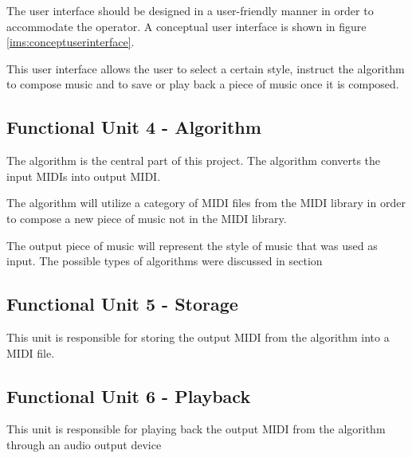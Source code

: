 The user interface should be designed in a user-friendly manner in order to accommodate the operator.
A conceptual user interface is shown in figure \ref{ims:conceptuserinterface}. 

This user interface allows the user to select a certain style, instruct the algorithm to compose music and to save or play back a piece of music once it is composed.

\subsection{Functional Unit 4 - Algorithm}
The algorithm is the central part of this project. The algorithm converts the input \acp{MIDI} into output \ac{MIDI}.

The algorithm will utilize a category of \ac{MIDI} files from the \ac{MIDI} library in order to compose a new piece of music not in the \ac{MIDI} library.

The output piece of music will represent the style of music that was used as input.
The possible types of algorithms were discussed in section \label{chap:comp_algo}

\subsection{Functional Unit 5 - Storage}
This unit is responsible for storing the output \ac{MIDI} from the algorithm into a \ac{MIDI} file.

\subsection{Functional Unit 6 - Playback}
This unit is responsible for playing back the output \ac{MIDI} from the algorithm through an audio output device

